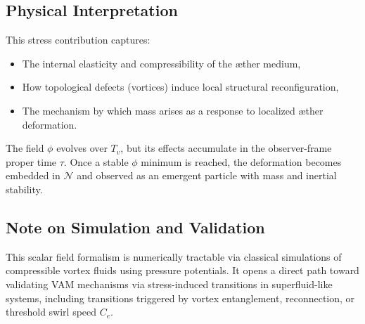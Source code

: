 \subsection*{Physical Interpretation}

This stress contribution captures:
\begin{itemize}
  \item The internal elasticity and compressibility of the æther medium,
  \item How topological defects (vortices) induce local structural reconfiguration,
  \item The mechanism by which mass arises as a response to localized æther deformation.
\end{itemize}

The field $\phi$ evolves over $T_v$, but its effects accumulate in the observer-frame proper time $\tau$. Once a stable $\phi$ minimum is reached, the deformation becomes embedded in $\mathcal{N}$ and observed as an emergent particle with mass and inertial stability.

\subsection*{Note on Simulation and Validation}

This scalar field formalism is numerically tractable via classical simulations of compressible vortex fluids using pressure potentials. It opens a direct path toward validating VAM mechanisms via stress-induced transitions in superfluid-like systems, including transitions triggered by vortex entanglement, reconnection, or threshold swirl speed $C_e$.


